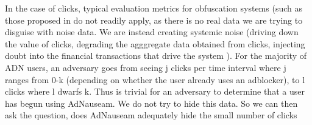 \documentclass[conference]{IEEEtran}
\begin{document}
%
%
%


%
%

%
%

In the case of clicks, typical evaluation metrics for obfuscation systems (such as those proposed in \cite{Peddinti} do not readily apply, as there is no real data we are trying to disguise with noise data. We are instead creating systemic noise (driving down the value of clicks, degrading the agggregate data obtained from clicks, injecting doubt into the financial transactions that drive the system ). For the majority of ADN users, an adversary goes from seeing j clicks per time interval where j ranges from 0-k (depending on whether the user already uses an adblocker), to l clicks where l dwarfs k. Thus is trivial for an adversary to determine that a user has begun using AdNauseam. We do not try to hide this data. So we can then ask the question, does AdNauseam adequately hide the small number of clicks
\end{document}
